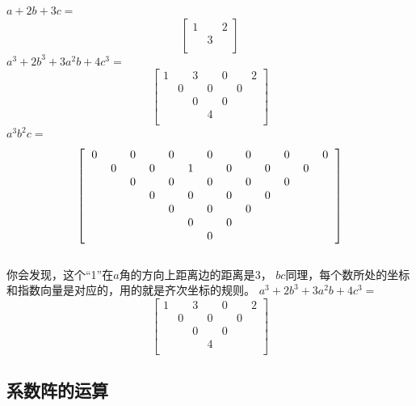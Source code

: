\documentclass[UTF8]{ctexart}
\begin{document}
$ a+2b+3c= $
\renewcommand*{\arraystretch}{1.732}\[\left[\begin{matrix}
	1& &2 \\
	& 3& \\
\end{matrix}\right]\]
$ a^{3}+2b^{3}+3a^{2}b+4c^{3}= $
\renewcommand*{\arraystretch}{1.732}\[\left[\begin{matrix}
	1& & 3& & 0& &2 \\
	& 0& &0 & &0 & \\
	& & 0& &0 & & \\
	& & & 4& & & \\
\end{matrix}\right]\]
$ a^{3}b^{2}c= $
\renewcommand*{\arraystretch}{1.732}\[
\left[\begin{matrix}
	\begin{tabular}{ccccccccccccc}
		0& &0& &0& &0& &0& &0& &0\\
		&0& &0& &1& &0& &0& &0&\\
		& &0& &0& &0& &0& &0& &\\
		& & &0& &0& &0& &0& & &\\
		& & & &0& &0& &0& & & &\\
		& & & & &0& &0& & & & &\\
		& & & & & &0& & & & & &\\
	\end{tabular}
\end{matrix}\right]
\]\\
你会发现，这个“1”在$ a $角的方向上距离边的距离是$ 3 $，
$ bc $同理，每个数所处的坐标和指数向量是对应的，用的就是齐次坐标的规则。
$ a^{3}+2b^{3}+3a^{2}b+4c^{3}= $
\renewcommand*{\arraystretch}{1.732}\[
\left[\begin{matrix}
	1& &3& &0& &2\\
	&0& &0& &0&\\
	& &0& &0& & \\
	& & &4& & &\\
\end{matrix}\right]
\]
\subsection{系数阵的运算}
\end{document}
